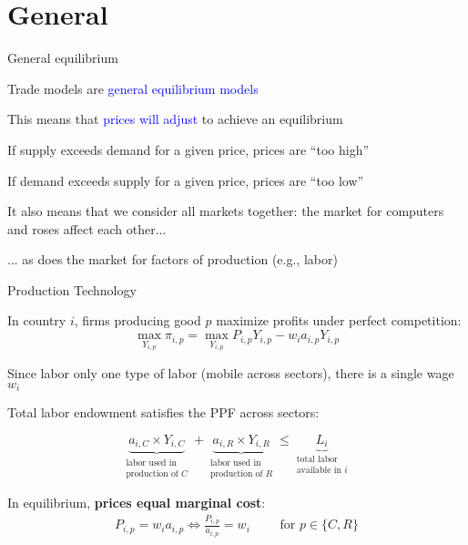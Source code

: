 \documentclass[notes,11pt, aspectratio=169, xcolor=table]{beamer}
\newcommand{\blue}[1]{\textcolor{blue}{#1}}
\newenvironment{wideitemize}{\itemize\addtolength{\itemsep}{10pt}}{\enditemize}
\begin{document}
\section{General}

\begin{frame}{General equilibrium}
\begin{wideitemize}
        \item Trade models are \blue{general equilibrium models}
        \item This means that \blue{prices will adjust} to achieve an equilibrium
        \item If supply exceeds demand for a given price, prices are ``too high''
        \item If demand exceeds supply for a given price,  prices are ``too low''
        \item It also means that we consider all markets together: the market for computers and roses affect each other...
        \item ... as does the market for factors of production (e.g., labor)
        \end{wideitemize}
\end{frame}

\begin{frame}{Production Technology}
\begin{wideitemize}
        \item In country $i$, firms producing good $p$ maximize profits under perfect competition:
        \begin{equation*}
            \max_{Y_{i,p}} \pi_{i,p} = \max_{Y_{i,p}} P_{i,p}Y_{i,p} - w_i a_{i,p} Y_{i,p} 
        \end{equation*}
        \item Since labor only one type of labor (mobile across sectors), there is a single wage $w_i$
        \item Total labor endowment satisfies the PPF across sectors:
        
        \begin{equation*}
            \underbrace{a_{i,C} \times Y_{i,C}}_{\substack{\text{labor used in} \\ \text{production of } C}} + \underbrace{a_{i,R} \times Y_{i,R}}_{\substack{\text{labor used in} \\ \text{production of } R}} \le \underbrace{L_i}_{\substack{\text{total labor} \\ \text{available in } i}}
        \end{equation*}

        \item In equilibrium, \textbf{prices equal marginal cost}:
        \begin{eqnarray*}
            P_{i,p} = w_i a_{i,p} \iff \frac{P_{i,p}}{a_{i,p}} = w_i  \qquad \text{ for } p \in\{C,R\}
        \end{eqnarray*}
    \end{wideitemize}
\end{frame}
\end{document}
